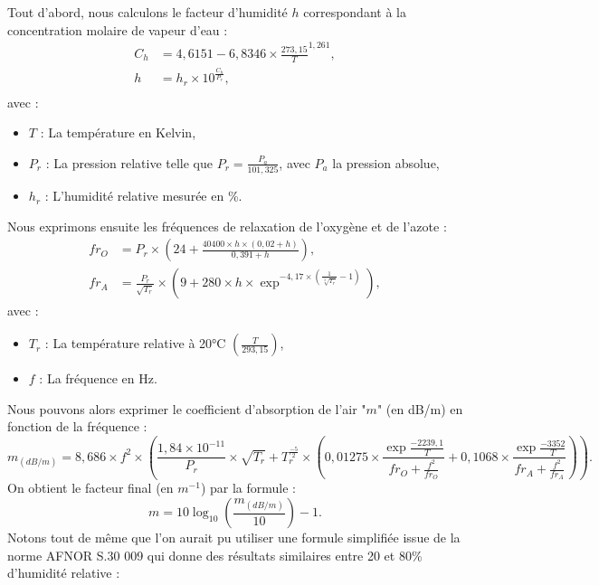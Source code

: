 Tout d'abord, nous calculons le facteur d'humidité $h$ correspondant à la concentration molaire de vapeur d'eau \cite[Annexe B, B.1]{iso} :
%
\begin{align*}
	C_h & = 4,6151 - 6,8346 \times \frac{273,15}{T}^{1,261},  \\
	h & = h_r \times 10^{\frac{C_h}{P_r}}, \\ 
\end{align*}
avec :
\begin{itemize}
\item $T$ : La température en Kelvin,
\item $P_r$ : La pression relative telle que $P_r = \frac{P_a}{101,325}$, avec $P_a$ la pression absolue,
\item $h_r$ : L'humidité relative mesurée en \%.
\end{itemize}
Nous exprimons ensuite les fréquences de relaxation de l'oxygène et de l'azote \cite[6.2, eq. 3 et 4]{iso}:
%
\begin{align*}
	fr_O & =  P_r \times \left(24 + \frac{40400 \times h \times (0,02 + h)}{0,391 + h}\right),  \\
	fr_A & =  \frac{P_r}{\sqrt{T_r}} \times \left(9 + 280 \times h \times \exp^{-4,17 \times (\frac{1}{\sqrt[3]{T_r}} - 1)}\right),
\end{align*}
avec :
\begin{itemize}
\item $T_r$ : La température relative à 20°C $\left(\frac{T}{293,15}\right)$,
\item $f$ : La fréquence en Hz.
\end{itemize}
%
Nous pouvons alors exprimer le coefficient d'absorption de l'air "$m$" (en dB/m) en fonction de la fréquence \cite[6.2, eq. 5]{iso} :
%
\begin{equation*}
	m_{(dB/m)} = 8,686 \times f^2 \times \left(\frac{1,84 \times 10^{-11}}{P_r} \times \sqrt{T_r} + T_r^{\frac{-5}{2}} \times \left(0,01275 \times \frac{\exp{\frac{-2239,1}{T}}}{fr_O + \frac{f^2}{fr_O}} + 0,1068 \times  \frac{\exp{\frac{-3352}{T}}}{fr_A + \frac{f^2}{fr_A}}\right)\right).
\end{equation*}
On obtient le facteur final (en $m^{-1}$) par la formule :
\begin{equation}
	m = 10\log_{10}{\left(\frac{m_{(dB/m)}}{10}\right)} - 1.
\end{equation}
%
Notons tout de même que l'on aurait pu utiliser une formule simplifiée issue de la norme AFNOR S.30 009 qui donne des résultats similaires entre 20 et 80\% d'humidité relative \cite[p. 68-70]{jouhaneau} :
